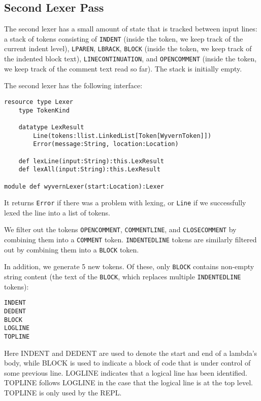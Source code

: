 \documentclass[11pt]{article}
\begin{document}
\begin{sloppypar}

\subsection{Second Lexer Pass}

The second lexer has a small amount of state that is tracked between input lines: a stack of tokens consisting of \texttt{INDENT} (inside the token, we keep track of the current indent level), \texttt{LPAREN}, \texttt{LBRACK}, \texttt{BLOCK} (inside the token, we keep track of the indented block text), \texttt{LINECONTINUATION}, and \texttt{OPENCOMMENT} (inside the token, we keep track of the comment text read so far).  The stack is initially empty.

The second lexer has the following interface:

\begin{lstlisting}
resource type Lexer
    type TokenKind
    
    datatype LexResult
        Line(tokens:llist.LinkedList[Token[WyvernToken]])
        Error(message:String, location:Location)
    
    def lexLine(input:String):this.LexResult
    def lexAll(input:String):this.LexResult

module def wyvernLexer(start:Location):Lexer
\end{lstlisting}

It returns \texttt{Error} if there was a problem with lexing, or \texttt{Line} if we successfully lexed the line into a list of tokens.

We filter out the tokens \texttt{OPENCOMMENT}, \texttt{COMMENTLINE}, and \texttt{CLOSECOMMENT} by combining them into a \texttt{COMMENT} token.  \texttt{INDENTEDLINE} tokens are similarly filtered out by combining them into a \texttt{BLOCK} token.

In addition, we generate 5 new tokens.  Of these, only \texttt{BLOCK} contains non-empty string content (the text of the \texttt{BLOCK}, which replaces multiple \texttt{INDENTEDLINE} tokens):

\begin{verbatim}
INDENT
DEDENT
BLOCK
LOGLINE
TOPLINE
\end{verbatim}

Here INDENT and DEDENT are used to denote the start and end of a lambda's body, while BLOCK is used to indicate a block of code that is under control of some previous line.  LOGLINE indicates that a logical line has been identified.  TOPLINE follows LOGLINE in the case that the logical line is at the top level.  TOPLINE is only used by the REPL.


\end{sloppypar}
\end{document}
